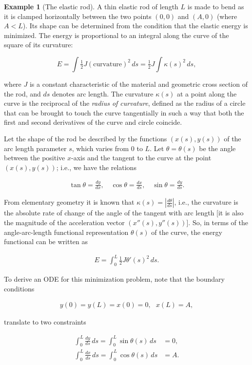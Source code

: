 \documentclass[11pt]{report}
\theoremstyle{plain}
\theoremstyle{definition}
\newtheorem{example}[thm]{Example}
\begin{document}
\begin{example}[The elastic rod]
A thin elastic rod of length $L$ is made to bend as
it is clamped horizontally between the two points
$(0,0)$ and $(A,0)$ (where $A<L$). Its shape can be
determined from the condition that the elastic energy
is minimized. The energy is proportional to an
integral along the curve of the square of its
curvature:

\[
E = \int \tfrac12 J (\textrm{curvature})^2\,ds = \tfrac12 J \int \kappa(s)^2 \,ds,
\]

where $J$ is a constant characteristic of the
material and geometric cross section of the rod, and
$ds$ denotes arc length. The curvature $\kappa(s)$ at
a point along the curve is the reciprocal of the
\emph{radius of curvature}, defined as the radius of a
circle that can be brought to touch the curve
tangentially in such a way that both the first and
second derivatives of the curve and circle coincide.

Let the shape of the rod be described by the
functions $(x(s), y(s))$ of the arc length parameter
$s$, which varies from $0$ to $L$. Let
$\theta=\theta(s)$ be the angle between the positive
$x$-axis and the tangent to the curve at the point
$(x(s),y(s))$; i.e., we have the relations

\begin{align*}
\tan \theta = \frac{dy}{dx}, \quad \cos\theta = \frac{dx}{ds}, \quad \sin\theta = \frac{dy}{ds}.
\end{align*}

From elementary geometry it is known that
$\kappa(s) = |\frac{d\theta}{ds}|$, i.e., the
curvature is the absolute rate of change of the angle
of the tangent with arc length [it is also the
magnitude of the acceleration vector
$(x''(s),y''(s))$]. So, in terms of the
angle-arc-length functional representation $\theta(s)$
of the curve, the energy functional can be written as

\begin{align*}
E = \int_0^L \tfrac12 J \theta'(s)^2 \,ds.
\end{align*}

To derive an ODE for this minimization problem, note
that the boundary conditions

\begin{align*}
y(0) = y(L) = x(0)= 0, \ \ \ x(L)=A,
\end{align*}

translate to two constraints

\begin{align*}
\int_0^L \frac{dy}{ds}\,ds = \int_0^L \sin\theta(s)\,ds &= 0, \\
\int_0^L \frac{dx}{ds}\,ds = \int_0^L \cos\theta(s)\,ds &= A.
\end{align*}


\end{example}
\end{document}
